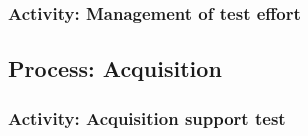 \begin{comment}
			\begin{table}
			\caption{Example task description (for one task)}
			\label{tab:example-task-description}
			\centering
			\begin{tabular}{@{}lp{0.7\linewidth}lp{}}
			\toprule
			\emph{Task} & Generate system test design \\
			\midrule
			\emph{Methods} & Ensure that test design correctly emanates from the system test plan and conforms
			to IEEE Std 829-2008 regarding purpose, format, and content.\\
			\emph{Inputs} & System Test Plan, IEEE Std 829-2008 \\
			\emph{Outputs} & System Test Design, provide input to Master Test Report \\
			\emph{Schedule} & Initiate (with all inputs received) 30 days after the start of the project. Must be
			completed and approved 120 days after start of project. \\
			\emph{Resources} & Refer to MTP clause 1.5.4. \\
			\emph{Risk(s) and assumptions} & Risk: adequacy and timeliness of the test plans
			Assumption: Timeliness is a primary concern because the team writing the test
			cases is dependent on the receipt of this the test plans \\
			\emph{Roles and responsibilities} & Refer to MTP clause 1.5.5. \\
			\bottomrule
			\end{tabular}
			\end{table}
			$>$
		\end{comment}

	
	\subsubsection{Activity: Management of test effort} \label{s:details-of-the-master-test-plan:activity-management-of-test-effort}
	
	\subsection{Process: Acquisition} \label{s:details-of-the-master-test-plan:process-acquisiton}
	
	\subsubsection{Activity: Acquisition support test} \label{s:details-of-the-master-test-plan:activitiy-acquisition-support-test} 
	
